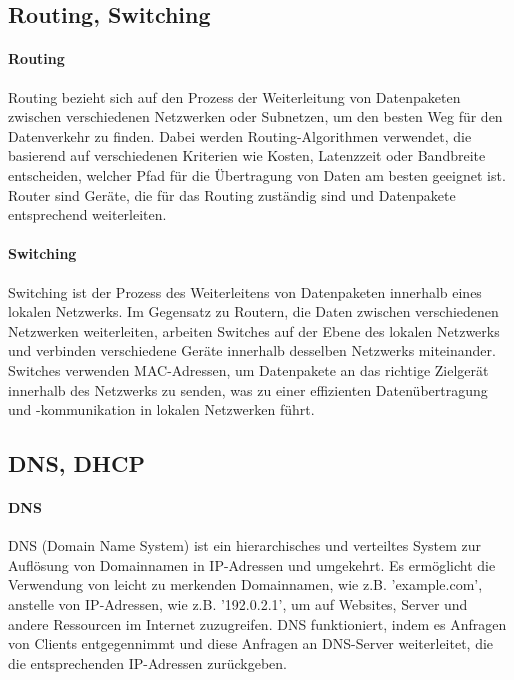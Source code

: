 \subsection{Routing, Switching}

\paragraph{Routing}

Routing bezieht sich auf den Prozess der Weiterleitung von Datenpaketen zwischen verschiedenen Netzwerken oder Subnetzen, um den besten Weg für den Datenverkehr zu finden. Dabei werden Routing-Algorithmen verwendet, die basierend auf verschiedenen Kriterien wie Kosten, Latenzzeit oder Bandbreite entscheiden, welcher Pfad für die Übertragung von Daten am besten geeignet ist. Router sind Geräte, die für das Routing zuständig sind und Datenpakete entsprechend weiterleiten.

\paragraph{Switching}

Switching ist der Prozess des Weiterleitens von Datenpaketen innerhalb eines lokalen Netzwerks. Im Gegensatz zu Routern, die Daten zwischen verschiedenen Netzwerken weiterleiten, arbeiten Switches auf der Ebene des lokalen Netzwerks und verbinden verschiedene Geräte innerhalb desselben Netzwerks miteinander. Switches verwenden MAC-Adressen, um Datenpakete an das richtige Zielgerät innerhalb des Netzwerks zu senden, was zu einer effizienten Datenübertragung und -kommunikation in lokalen Netzwerken führt.

\subsection{DNS, DHCP}

\paragraph{DNS}

DNS (Domain Name System) ist ein hierarchisches und verteiltes System zur Auflösung von Domainnamen in IP-Adressen und umgekehrt. Es ermöglicht die Verwendung von leicht zu merkenden Domainnamen, wie z.B. 'example.com', anstelle von IP-Adressen, wie z.B. '192.0.2.1', um auf Websites, Server und andere Ressourcen im Internet zuzugreifen. DNS funktioniert, indem es Anfragen von Clients entgegennimmt und diese Anfragen an DNS-Server weiterleitet, die die entsprechenden IP-Adressen zurückgeben.

